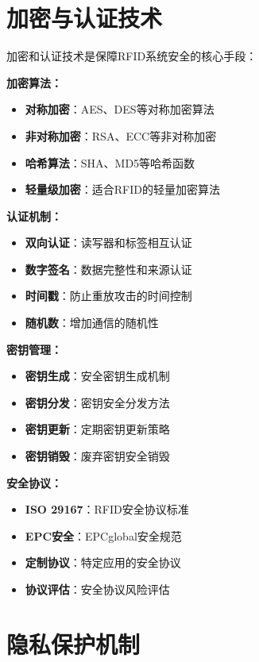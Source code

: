 \documentclass[12pt,UTF8]{ctexbook}
\begin{document}
\begin{itemize}[leftmargin=3.5em]
\begin{itemize}[leftmargin=3.5em]
\begin{itemize}[leftmargin=3.5em]
\begin{itemize}[leftmargin=3.5em]
\section{加密与认证技术}

加密和认证技术是保障RFID系统安全的核心手段：

\textbf{加密算法：}
\begin{itemize}[leftmargin=3.5em]
    \item \textbf{对称加密}：AES、DES等对称加密算法
    \item \textbf{非对称加密}：RSA、ECC等非对称加密
    \item \textbf{哈希算法}：SHA、MD5等哈希函数
    \item \textbf{轻量级加密}：适合RFID的轻量加密算法
\end{itemize}

\textbf{认证机制：}
\begin{itemize}[leftmargin=3.5em]
    \item \textbf{双向认证}：读写器和标签相互认证
    \item \textbf{数字签名}：数据完整性和来源认证
    \item \textbf{时间戳}：防止重放攻击的时间控制
    \item \textbf{随机数}：增加通信的随机性
\end{itemize}

\textbf{密钥管理：}
\begin{itemize}[leftmargin=3.5em]
    \item \textbf{密钥生成}：安全密钥生成机制
    \item \textbf{密钥分发}：密钥安全分发方法
    \item \textbf{密钥更新}：定期密钥更新策略
    \item \textbf{密钥销毁}：废弃密钥安全销毁
\end{itemize}

\textbf{安全协议：}
\begin{itemize}[leftmargin=3.5em]
    \item \textbf{ISO 29167}：RFID安全协议标准
    \item \textbf{EPC安全}：EPCglobal安全规范
    \item \textbf{定制协议}：特定应用的安全协议
    \item \textbf{协议评估}：安全协议风险评估
\end{itemize}

\section{隐私保护机制}


\end{itemize}
\end{itemize}
\end{itemize}
\end{itemize}
\end{document}
